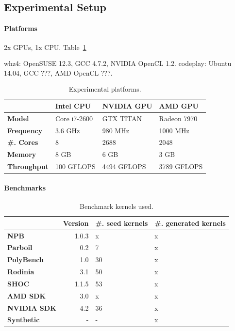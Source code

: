 \documentclass[preprint,nonatbib,10pt,nocopyrightspace]{sigplanconf}
\begin{document}
\subsection{Experimental Setup}\label{subsec:}

\paragraph{Platforms} 2x GPUs, 1x CPU. Table~\ref{tab:platforms}

whz4: OpenSUSE 12.3, GCC 4.7.2, NVIDIA OpenCL 1.2.
codeplay: Ubuntu 14.04, GCC ???, AMD OpenCL ???.

\begin{table}%
\scriptsize
\centering
\begin{tabular}{l l l l}
  \toprule
  & \textbf{Intel CPU} & \textbf{NVIDIA GPU} & \textbf{AMD GPU} \\
  \midrule
  \textbf{Model} & Core i7-2600 & GTX TITAN & Radeon 7970 \\
  \textbf{Frequency} & 3.6 GHz & 980 MHz & 1000 MHz \\
  \textbf{\#. Cores} & 8 & 2688 & 2048 \\
  \textbf{Memory} & 8 GB & 6 GB & 3 GB \\
  \textbf{Throughput} & 100 GFLOPS & 4494 GFLOPS & 3789 GFLOPS \\
  \bottomrule
\end{tabular}
\caption{Experimental platforms.}
\label{tab:platforms}
\end{table}


\paragraph{Benchmarks}

\begin{table}%
\scriptsize
\centering
\begin{tabular}{l r R{2cm} R{2cm}}
  \toprule
  & \textbf{Version} & \textbf{\#. seed kernels} & \textbf{\#. generated kernels}\\
  \midrule
  \textbf{NPB~\cite{Seo2011}} & 1.0.3 & x & x \\
  \textbf{Parboil~\cite{Stratton2012}} & 0.2 & 7 & x \\
  \textbf{PolyBench~\cite{Grauer-Gray2012}} & 1.0 & 30 & x \\
  \textbf{Rodinia~\cite{Che2009}} & 3.1 & 50 & x \\
  \textbf{SHOC~\cite{Danalis2010}} & 1.1.5 & 53 & x \\
  \textbf{AMD SDK} & 3.0 & x & x \\
  \textbf{NVIDIA SDK} & 4.2 & 36 & x \\
  \textbf{Synthetic} & - & - & x \\
  \bottomrule
\end{tabular}
\caption{%
  Benchmark kernels used.
}
\label{tab:benchmarks}
\end{table}
\end{document}
